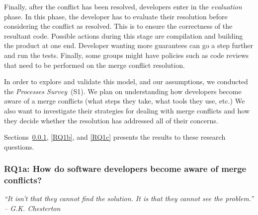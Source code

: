 Finally, after the conflict has been resolved, developers enter in the \emph{evaluation} phase.
In this phase, the developer has to evaluate their resolution before considering the conflict as resolved.
This is to ensure the correctness of the resultant code.
Possible actions during this stage are compilation and building the product at one end.
Developer wanting more guarantees can go a step further and run the tests.
Finally, some groups might have policies such as code reviews that need to be performed on the merge conflict resolution.
 
In order to explore and validate this model, and our assumptions, we conducted the \emph{Processes Survey}~(S1).
We plan on understanding how developers become aware of a merge conflicts (what steps they take, what tools they use, etc.)
We also want to investigate their strategies for dealing with merge conflicts and how they decide whether the resolution has addressed all of their concerns.

Sections~\ref{RQ1a}, \ref{RQ1b}, and \ref{RQ1c} presents the results to these research questions.

\subsubsection{\textbf{RQ1a:} How do software developers become aware of merge conflicts?}\label{RQ1a}
\vspace*{-0.5\baselineskip}
\begin{quoting}
\textit{``It isn't that they cannot find the solution. It is that they cannot see the problem.'' -- G.K. Chesterton}
\end{quoting}
\vspace*{+0.3\baselineskip}

